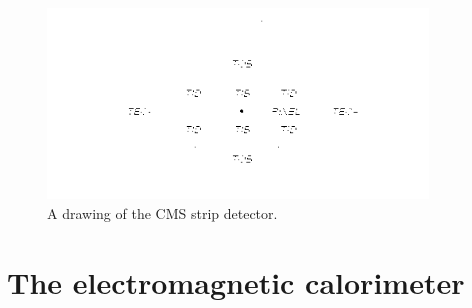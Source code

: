 \begin{figure}[htbp]
	\centering
		\includegraphics[width=0.9\textwidth]{Figures/strip_detector.png}
	\caption[CMS Strip Detector]{A drawing of the CMS strip detector. \cite{Chatrchyan:2008aa}}
	\label{fig:strips}
\end{figure}


\section{The electromagnetic calorimeter}

